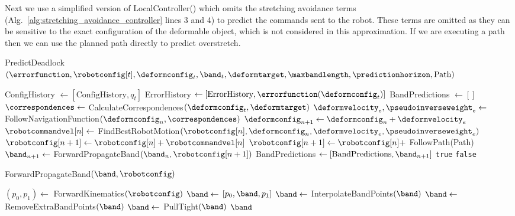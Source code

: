 Next we use a simplified version of LocalController() which omits the stretching avoidance terms (Alg.~\ref{alg:stretching_avoidance_controller} lines 3 and 4) to predict the commands sent to the robot. These terms are omitted as they can be sensitive to the exact configuration of the deformable object, which is not considered in this approximation. If we are executing a path then we can use the planned path directly to predict overstretch.


\begin{algorithm}[t]
\caption{PredictDeadlock$(\errorfunction, \robotconfig[t], \deformconfig_t, \band_t, \deformtarget,\maxbandlength, \predictionhorizon,\textrm{Path})$}
\begin{algorithmic}[1]
    \State ConfigHistory $\gets [\textrm{ConfigHistory}, q_t]$
    \State ErrorHistory $\gets [\textrm{ErrorHistory}, \errorfunction(\deformconfig_t)]$
    \State BandPredictions $\gets []$
    \State $\correspondences \gets$ CalculateCorrespondences$(\deformconfig_t, \deformtarget)$
            \State $\deformvelocity_e, \pseudoinverseweight_e \gets$ FollowNavigationFunction$(\deformconfig_n, \correspondences)$
            \State $\deformconfig_{n + 1} \gets \deformconfig_n + \deformvelocity_e$
            \State $\robotcommandvel[n] \gets$ FindBestRobotMotion$(\robotconfig[n], \deformconfig_{n}, \deformvelocity_e, \pseudoinverseweight_e)$
            \State $\robotconfig[n + 1] \gets \robotconfig[n] + \robotcommandvel[n]$
        \Else
            \State $\robotconfig[n + 1] \gets \robotconfig[n] + $ FollowPath(Path)
        \EndIf
        \State $\band_{n + 1} \gets$ ForwardPropagateBand$(\band_n, \robotconfig[n + 1])$
        \State BandPredictions $\gets [\textrm{BandPredictions}, \band_{n + 1}]$
    \EndFor
        \State \Return \texttt{true}
    \Else
        \State \Return \texttt{false}
    \EndIf
\end{algorithmic}
\label{alg:predict_deadlock}
\end{algorithm}


\begin{algorithm}[t]
\caption{ForwardPropagateBand$(\band, \robotconfig)$}
\begin{algorithmic}[1]
    \State $(p_0, p_1) \gets$ ForwardKinematics$(\robotconfig)$
    \State $\band \gets$ $[p_0, \band, p_1]$
    \State $\band \gets$ InterpolateBandPoints$(\band)$
    \State $\band \gets$ RemoveExtraBandPoints$(\band)$
    \State $\band \gets$ PullTight$(\band)$
    \State \Return $\band$
\end{algorithmic}
\label{alg:band_propogation}
\end{algorithm}





